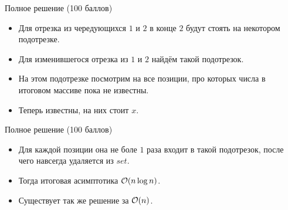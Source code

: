 \begin{frame}{Полное решение (100 баллов)}
  \begin{itemize}
  \item Для отрезка из чередующихся $1$ и $2$ в конце $2$ будут стоять на некотором подотрезке.
  \item Для изменившегося отрезка из $1$ и $2$ найдём такой подотрезок.
  \item На этом подотрезке посмотрим на все позиции, про которых числа в итоговом массиве пока не известны.
  \item Теперь известны, на них стоит $x$.
  \end{itemize}
\end{frame}

\begin{frame}{Полное решение (100 баллов)}
  \begin{itemize}
  \item Для каждой позиции она не боле $1$ раза входит в такой подотрезок, после чего навсегда удаляется из $set$.
  \item Тогда итоговая асимптотика $\mathcal{O}(n \log n)$.
  \item Существует так же решение за $\mathcal{O}(n)$.
  \end{itemize}
\end{frame}